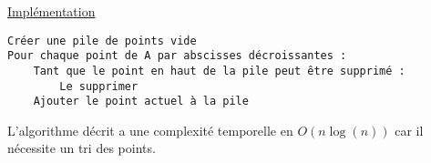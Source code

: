 \documentclass[11pt,a4paper]{article}
\begin{document}
\noindent\href{https://github.com/AdrienVannson/algo-lib/blob/master/include/geometry/convex-hull.hpp}{Implémentation}
\begin{lstlisting}
Créer une pile de points vide
Pour chaque point de A par abscisses décroissantes :
    Tant que le point en haut de la pile peut être supprimé :
        Le supprimer
    Ajouter le point actuel à la pile
\end{lstlisting}

L'algorithme décrit a une complexité temporelle en \(O(n \log(n) )\) car il nécessite un tri des points.
\end{document}
